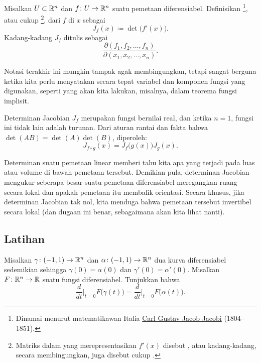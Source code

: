 \begin{defn}
Misalkan $U \subset {\mathbb{R}}^n$ dan
$f \colon U \to {\mathbb{R}}^n$ suatu pemetaan diferensiabel.  Definisikan
\emph{}%
\footnote{Dinamai menurut matematikawan Italia
\href{https://en.wikipedia.org/wiki/Carl_Gustav_Jacob_Jacobi}{Carl Gustav Jacob Jacobi}
(1804--1851).},
atau cukup
\emph{}%
\footnote{Matriks dalam  yang merepresentasikan $f'(x)$
disebut
\emph{}, atau kadang-kadang, secara membingungkan, juga disebut cukup
.},
dari $f$ di $x$ sebagai
\begin{equation*}
J_f(x) \coloneqq \det\bigl( f'(x) \bigr) .
\end{equation*}
Kadang-kadang $J_f$ ditulis sebagai
\begin{equation*}
\frac{\partial(f_1,f_2,\ldots,f_n)}{\partial(x_1,x_2,\ldots,x_n)} .
\end{equation*}
\end{defn}

Notasi terakhir ini mungkin tampak agak membingungkan,
tetapi sangat berguna ketika kita perlu menyatakan
secara tepat variabel dan komponen fungsi yang digunakan,
seperti yang akan kita lakukan, misalnya, dalam teorema fungsi implisit.

Determinan Jacobian $J_f$ merupakan fungsi bernilai real, dan ketika $n=1$, fungsi ini tidak lain adalah
turunan.
Dari aturan rantai dan fakta bahwa $\det(AB) = \det(A)\det(B)$, diperoleh:
\begin{equation*}
J_{f \circ g} (x) = J_f\bigl(g(x)\bigr) J_g(x) .
\end{equation*}

Determinan suatu pemetaan linear memberi tahu kita apa yang terjadi pada
luas atau volume di bawah pemetaan tersebut.
Demikian pula, determinan Jacobian mengukur seberapa besar suatu pemetaan diferensiabel
meregangkan ruang secara lokal dan apakah pemetaan itu membalik orientasi.  Secara khusus, jika determinan
Jacobian
tak nol, kita menduga bahwa pemetaan tersebut invertibel secara lokal (dan
dugaan ini benar, sebagaimana akan kita lihat nanti).

\subsection{Latihan}

\begin{exercise}
Misalkan $\gamma \colon (-1,1) \to {\mathbb{R}}^n$ dan
$\alpha \colon (-1,1) \to {\mathbb{R}}^n$ dua kurva diferensiabel
sedemikian sehingga $\gamma(0) = \alpha(0)$ dan $\gamma'(0) = \alpha'(0)$.
Misalkan $F \colon {\mathbb{R}}^n \to {\mathbb{R}}$ suatu fungsi diferensiabel.  Tunjukkan bahwa
\begin{equation*}
\frac{d}{dt}\Big|_{t=0}
F\bigl(\gamma(t)\bigr)
=
\frac{d}{dt}\Big|_{t=0}
F\bigl(\alpha(t)\bigr)
.
\end{equation*}
\end{exercise}


